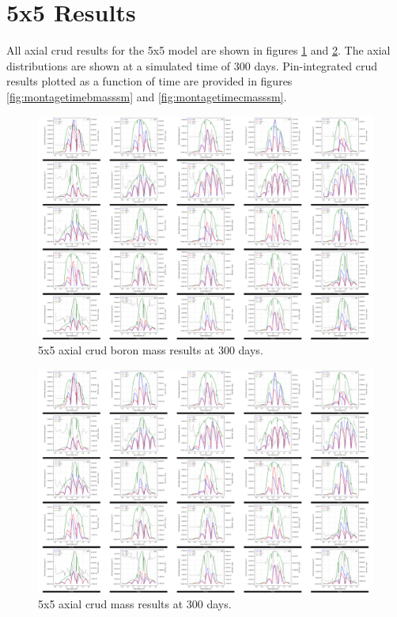 
\section{5x5 Results}

All axial crud results for the 5x5 model are shown in figures \ref{fig:montageaxialbmasssm} and \ref{fig:montageaxialcmasssm}.  The axial distributions are shown at a simulated time of 300 days. Pin-integrated crud results plotted as a function of time are provided in figures \ref{fig:montagetimebmasssm} and \ref{fig:montagetimecmasssm}.

\begin{landscape}
\begin{figure}[H]
    \centering
    \includegraphics[width=.96\linewidth]{figs/5x5/imp/montage_axial_bmass_sm}
    \caption{5x5 axial crud boron mass results at 300 days.}
    \label{fig:montageaxialbmasssm}
\end{figure}
\begin{figure}[H]
    \centering
    \includegraphics[width=.96\linewidth]{figs/5x5/imp/montage_axial_cmass_sm}
    \caption{5x5 axial crud mass results at 300 days.}
    \label{fig:montageaxialcmasssm}
\end{figure}


\end{landscape}
